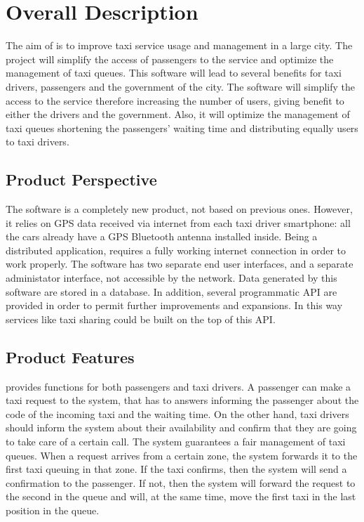 \section{Overall Description}
The aim of \myTaxiService{} is to improve taxi service usage and management in a large city.
The project will simplify the access of passengers to the service and optimize the management of taxi queues.
This software will lead to several benefits for taxi drivers, passengers and the government of the city.
The software will simplify the access to the service therefore increasing the number of users, giving benefit to either the drivers and the government.
Also, it will optimize the management of taxi queues shortening the passengers’ waiting time and distributing equally users to taxi drivers.
\subsection{Product Perspective}
The \myTaxiService{} software is a completely new product, not based on previous ones.
However, it relies on GPS data received via internet from each taxi driver smartphone: all the cars already have a GPS Bluetooth antenna installed inside.
Being a distributed application, \myTaxiService{} requires a fully working internet connection in order to work properly.
The software has two separate end user interfaces, and a separate administator interface, not accessible by the network.
Data generated by this software are stored in a database.
In addition, several programmatic API are provided in order to permit further improvements and expansions. In this way services like taxi sharing could be built on the top of this API.
\subsection{Product Features}
\myTaxiService{} provides functions for both passengers and taxi drivers.
A passenger can make a taxi request to the system, that has to answers informing the passenger about the code of the incoming taxi and the waiting time.
On the other hand, taxi drivers should inform the system about their availability and confirm that they are going to take care of a certain call. The system guarantees a fair management of taxi queues. When a request arrives from a certain zone, the system forwards it to the first taxi queuing in that zone. If the taxi confirms, then the system will send a confirmation to the passenger. If not, then the system will forward the request to the second in the queue and will, at the same time, move the first taxi in the last position in the queue.
